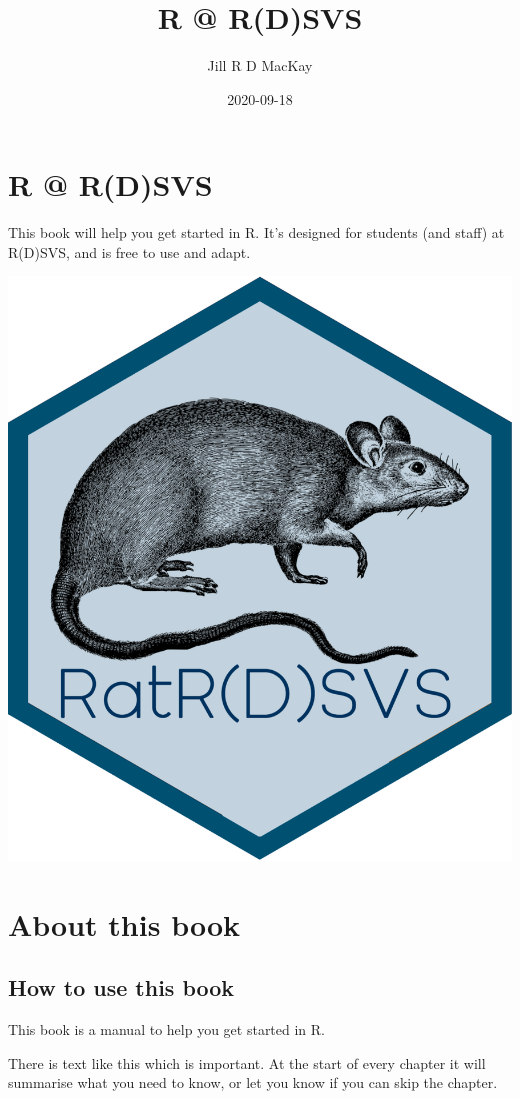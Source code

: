 \documentclass[
]{book}
\title{R @ R(D)SVS}
\author{Jill R D MacKay}
\date{2020-09-18}
\begin{document}
\maketitle

{
\setcounter{tocdepth}{1}
\tableofcontents
}
\hypertarget{r-rdsvs}{%
\chapter*{R @ R(D)SVS}\label{r-rdsvs}}

This book will help you get started in R. It's designed for students (and staff) at R(D)SVS, and is free to use and adapt.

\begin{center}\includegraphics[width=0.5\linewidth]{images/ratrdsvs} \end{center}

\hypertarget{about}{%
\chapter*{About this book}\label{about}}

\hypertarget{howuse}{%
\section{How to use this book}\label{howuse}}

This book is a manual to help you get started in R.

\begin{los}
There is text like this which is important. At the start of every
chapter it will summarise what you need to know, or let you know if you
can skip the chapter.
\end{los}
\end{document}
